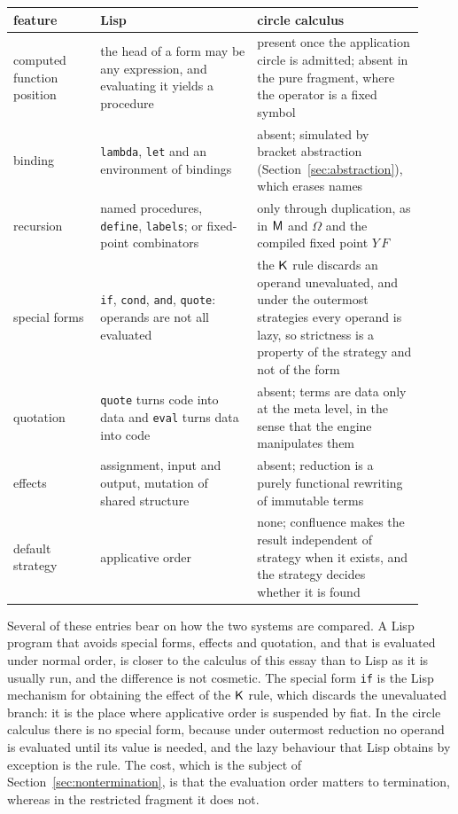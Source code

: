 \begin{center}
\begin{tabular}{p{0.20\linewidth}p{0.36\linewidth}p{0.36\linewidth}}
\toprule
feature & Lisp & circle calculus \\
\midrule
computed function position & the head of a form may be any expression, and evaluating it yields a procedure & present once the application circle is admitted; absent in the pure fragment, where the operator is a fixed symbol \\
binding & \texttt{lambda}, \texttt{let} and an environment of bindings & absent; simulated by bracket abstraction (Section~\ref{sec:abstraction}), which erases names \\
recursion & named procedures, \texttt{define}, \texttt{labels}; or fixed-point combinators & only through duplication, as in $\mathsf{M}$ and $\Omega$ and the compiled fixed point $Y\,F$ \\
special forms & \texttt{if}, \texttt{cond}, \texttt{and}, \texttt{quote}: operands are not all evaluated & the $\mathsf{K}$ rule discards an operand unevaluated, and under the outermost strategies every operand is lazy, so strictness is a property of the strategy and not of the form \\
quotation & \texttt{quote} turns code into data and \texttt{eval} turns data into code & absent; terms are data only at the meta level, in the sense that the engine manipulates them \\
effects & assignment, input and output, mutation of shared structure & absent; reduction is a purely functional rewriting of immutable terms \\
default strategy & applicative order & none; confluence makes the result independent of strategy when it exists, and the strategy decides whether it is found \\
\bottomrule
\end{tabular}
\end{center}

Several of these entries bear on how the two systems are compared. A Lisp program that avoids special forms, effects and quotation, and that is evaluated under normal order, is closer to the calculus of this essay than to Lisp as it is usually run, and the difference is not cosmetic. The special form \texttt{if} is the Lisp mechanism for obtaining the effect of the $\mathsf{K}$ rule, which discards the unevaluated branch: it is the place where applicative order is suspended by fiat. In the circle calculus there is no special form, because under outermost reduction no operand is evaluated until its value is needed, and the lazy behaviour that Lisp obtains by exception is the rule. The cost, which is the subject of Section~\ref{sec:nontermination}, is that the evaluation order matters to termination, whereas in the restricted fragment it does not.

